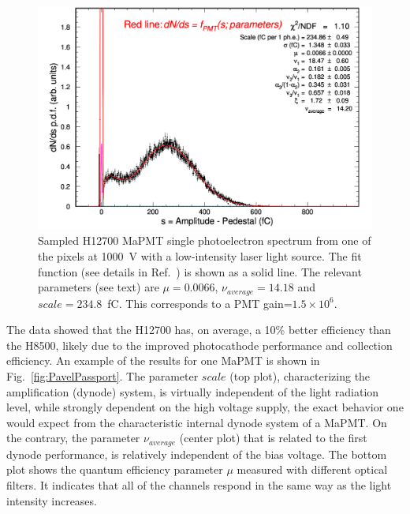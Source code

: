 \documentclass[5p,times,twocolumn]{elsarticle}
\def\MaPMT{MaPMT }
\begin{document}
\begin{figure}[ht]
	\centering
	\includegraphics[width=\linewidth]{H12700-r-W0-GA0982-w3-g064-v1000-t227-37.pdf}
	\caption{Sampled H12700 \MaPMT single photoelectron spectrum from one of the pixels at 1000~V with a low-intensity
          laser light source. The fit function (see details in Ref.~\cite{Pavel}) is shown as a solid line. 
          The relevant parameters (see text) are $\mu=0.0066$, $\nu_{average}=14.18$ and $scale=234.8$~fC. This corresponds
          to a PMT gain=$1.5 \times 10^6$.
          }
	\label{fig:SPEH12700}
\end{figure}

The data showed that the H12700 has, on average, a 10\% better efficiency than the H8500, likely due to the improved
photocathode performance and collection efficiency. An example of the results for one MaPMT is shown in
Fig.~\ref{fig:PavelPassport}. The parameter $scale$ (top plot), characterizing the amplification (dynode) system, is
virtually independent of the light radiation level, while strongly dependent on the high voltage supply, the exact behavior
one would expect from the characteristic internal dynode system of a MaPMT. On the contrary, the parameter $\nu_{average}$
(center plot) that is related to the first dynode performance, is relatively independent of the bias voltage. The bottom
plot shows the quantum efficiency parameter $\mu$ measured with different optical filters. It indicates that all of
the channels respond in the same way as the light intensity increases.
\end{document}
